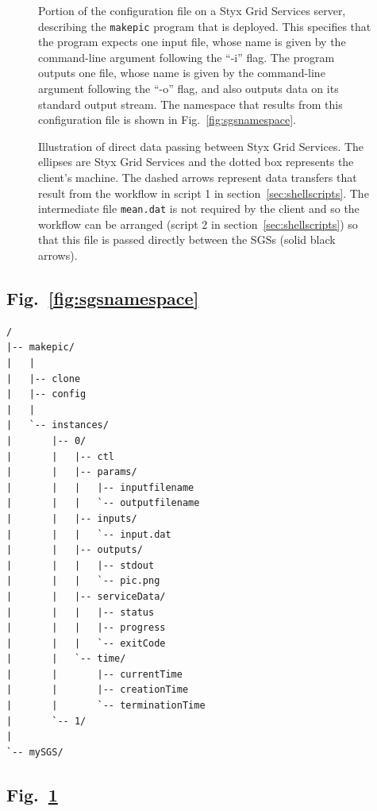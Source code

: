 \documentclass[a4paper]{article}
\begin{document}
\begin{figure}[h]
\caption{Portion of the configuration file on a Styx Grid Services server, describing the \texttt{makepic} program that is deployed.  This specifies that the program expects one input file, whose name is given by the command-line argument following the ``-i'' flag.  The program outputs one file, whose name is given by the command-line argument following the ``-o'' flag, and also outputs data on its standard output stream.  The namespace that results from this configuration file is shown in Fig.~\ref{fig:sgsnamespace}.}
\label{fig:makepicconfig}
\end{figure}

\begin{figure}[h]
\caption{Illustration of direct data passing between Styx Grid Services.  The ellipses are Styx Grid Services and the dotted box represents the client's machine.  The dashed arrows represent data transfers that result from the workflow in script 1 in section~\ref{sec:shellscripts}.  The intermediate file \texttt{mean.dat} is not required by the client and so the workflow can be arranged (script 2 in section~\ref{sec:shellscripts}) so that this file is passed directly between the SGSs (solid black arrows).}\label{fig:datapassing}
\end{figure}

\newpage

\subsection*{Fig.~\ref{fig:sgsnamespace}}
\begin{verbatim}
/
|-- makepic/
|   |
|   |-- clone
|   |-- config
|   |
|   `-- instances/
|       |-- 0/
|       |   |-- ctl
|       |   |-- params/
|       |   |   |-- inputfilename
|       |   |   `-- outputfilename
|       |   |-- inputs/
|       |   |   `-- input.dat
|       |   |-- outputs/
|       |   |   |-- stdout
|       |   |   `-- pic.png
|       |   |-- serviceData/
|       |   |   |-- status
|       |   |   |-- progress
|       |   |   `-- exitCode
|       |   `-- time/
|       |       |-- currentTime
|       |       |-- creationTime
|       |       `-- terminationTime
|       `-- 1/
|
`-- mySGS/
\end{verbatim}

\newpage

\subsection*{Fig.~\ref{fig:makepicconfig}}
\end{document}
